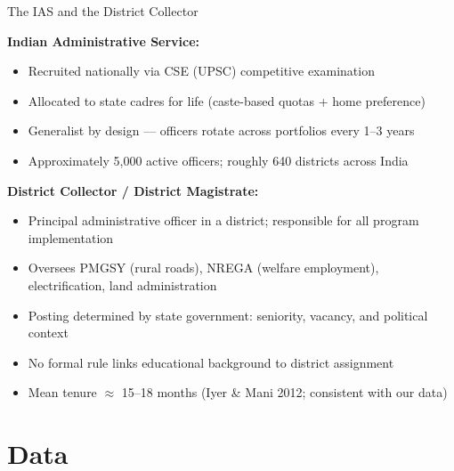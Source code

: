 \documentclass[aspectratio=169]{beamer}
\begin{document}
\begin{frame}{The IAS and the District Collector}

\textbf{Indian Administrative Service:}
\begin{itemize}
    \item Recruited nationally via CSE (UPSC) competitive examination
    \item Allocated to state cadres for life (caste-based quotas + home preference)
    \item Generalist by design --- officers rotate across portfolios every 1--3 years
    \item Approximately 5,000 active officers; roughly 640 districts across India
\end{itemize}

\bigskip

\textbf{District Collector / District Magistrate:}
\begin{itemize}
    \item Principal administrative officer in a district; responsible for all program implementation
    \item Oversees PMGSY (rural roads), NREGA (welfare employment), electrification, land administration
    \item Posting determined by state government: seniority, vacancy, and political context
    \item No formal rule links educational background to district assignment
    \item Mean tenure $\approx$ 15--18 months (Iyer \& Mani 2012; consistent with our data)
\end{itemize}

\end{frame}
\section{Data}
\end{document}
